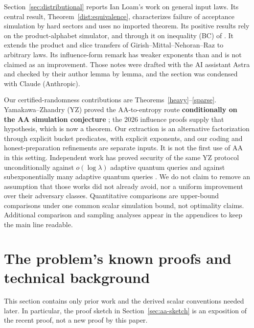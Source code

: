 \documentclass[11pt]{article}
\theoremstyle{definition}\newtheorem{definition}[theorem]{Definition}
\theoremstyle{remark}\newtheorem{remark}[theorem]{Remark}
\begin{document}
Section~\ref{sec:distributional} reports Ian Loam's work on general input laws. Its central result, Theorem~\ref{dist:equivalence}, characterizes failure of acceptance simulation by hard sectors and uses no imported theorem. Its positive results rely on the product-alphabet simulator, and through it on inequality (BC) of \cite{HMP26}. It extends the product and slice transfers of Girish--Mittal--Nehoran--Raz \cite{GMNR26} to arbitrary laws. Its influence-form remark has weaker exponents than \cite{Tur26} and is not claimed as an improvement. Those notes were drafted with the AI assistant Astra and checked by their author lemma by lemma, and the section was condensed with Claude (Anthropic).

Our certified-randomness contributions are Theorems~\ref{heavy}--\ref{sparse}. Yamakawa--Zhandry (YZ) proved the AA-to-entropy route \textbf{conditionally on the AA simulation conjecture} \cite[Theorem 8.4 and Conjecture 8.1]{YZ24}; the 2026 influence proofs supply that hypothesis, which is now a theorem. Our extraction is an alternative factorization through explicit bucket predicates, with explicit exponents, and our coding and honest-preparation refinements are separate inputs. It is not the first use of AA in this setting. Independent work has proved security of the same YZ protocol unconditionally against $o(\log\lambda)$ adaptive quantum queries and against subexponentially many adaptive quantum queries \cite{KRT26,CKMRSST26}. We do not claim to remove an assumption that those works did not already avoid, nor a uniform improvement over their adversary classes. Quantitative comparisons are upper-bound comparisons under one common scalar simulation bound, not optimality claims. Additional comparison and sampling analyses appear in the appendices to keep the main line readable.

\section{The problem's known proofs and technical background}\label{sec:background}
This section contains only prior work and the derived scalar conventions needed later. In particular, the proof sketch in Section~\ref{sec:aa-sketch} is an exposition of the recent proof, not a new proof by this paper.
\end{document}
